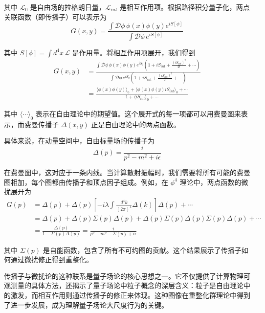 其中 $\mathcal{L}_0$ 是自由场的拉格朗日量，$\mathcal{L}_{int}$ 是相互作用项。根据路径积分量子化，两点关联函数（即传播子）可以表示为
\begin{equation*}
    G(x,y) = \frac{\int \mathcal{D}\phi \, \phi(x)\phi(y) e^{iS[\phi]}}{\int \mathcal{D}\phi \, e^{iS[\phi]}}
\end{equation*}

其中 $S[\phi] = \int d^4x \, \mathcal{L}$ 是作用量。将相互作用项展开，我们得到
\begin{align*}
    G(x,y) &= \frac{\int \mathcal{D}\phi \, \phi(x)\phi(y) e^{iS_0} \left(1 + iS_{int} + \frac{(iS_{int})^2}{2!} + \cdots\right)}{\int \mathcal{D}\phi \, e^{iS_0} \left(1 + iS_{int} + \frac{(iS_{int})^2}{2!} + \cdots\right)} \\
    &= \frac{\langle \phi(x)\phi(y) \rangle_0 + \langle \phi(x)\phi(y) iS_{int} \rangle_0 + \cdots}{1 + \langle iS_{int} \rangle_0 + \cdots}
\end{align*}

其中 $\langle \cdots \rangle_0$ 表示在自由理论中的期望值。这个展开式的每一项都可以用费曼图来表示，而费曼传播子 $\Delta(x,y)$ 正是自由理论中的两点函数。

具体来说，在动量空间中，自由标量场的传播子为
\begin{equation*}
    \Delta(p) = \frac{i}{p^2 - m^2 + i\epsilon}
\end{equation*}

在费曼图中，这对应于一条内线。当计算散射振幅时，我们需要将所有可能的费曼图相加，每个图都由传播子和顶点因子组成。例如，在 $\phi^4$ 理论中，两点函数的微扰展开为
\begin{align*}
    G(p) &= \Delta(p) + \Delta(p) \left[ -i\lambda \int \frac{d^4k}{(2\pi)^4} \Delta(k) \right] \Delta(p) + \cdots \\
    &= \Delta(p) + \Delta(p) \Sigma(p) \Delta(p) + \Delta(p) \Sigma(p) \Delta(p) \Sigma(p) \Delta(p) + \cdots \\
    &= \frac{\Delta(p)}{1 - \Sigma(p)\Delta(p)} = \frac{i}{p^2 - m^2 - \Sigma(p) + i\epsilon}
\end{align*}

其中 $\Sigma(p)$ 是自能函数，包含了所有不可约图的贡献。这个结果展示了传播子如何通过微扰修正得到重整化。

传播子与微扰论的这种联系是量子场论的核心思想之一。它不仅提供了计算物理可观测量的具体方法，还揭示了量子场论中粒子概念的深层含义：粒子是自由理论中的激发，而相互作用则通过传播子的修正来体现。这种图像在重整化群理论中得到了进一步发展，成为理解量子场论大尺度行为的关键。
